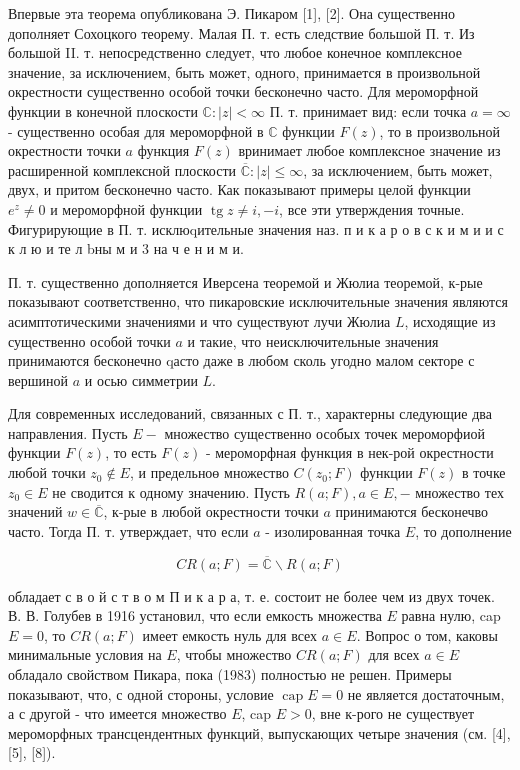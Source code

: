 \documentclass[10pt]{article}
\begin{document}
Впервые эта теорема опубликована Э. Пикаром [1], [2]. Она существенно дополняет Сохоцкого теорему. Малая П. т. есть следствие большой П. т. Из большой II. т. непосредственно следует, что любое конечное комплексное значение, за исключением, быть может, одного, принимается в произвольной окрестности существенно особой точки бесконечно часто. Для мероморфной функции в конечной плоскости $\mathbb{C}:|z|<\infty$ П. т. принимает вид: если точка $a=\infty$ - существенно особая для мероморфной в $\mathbb{C}$ функции $F(z)$, то в произвольной окрестности точки $a$ функция $F(z)$ вринимает любое комплексное значение из расширенной комплексной плоскости $\overline{\mathbb{C}}:|z| \leqslant \infty$, за исключением, быть может, двух, и притом бесконечно часто. Как показывают примеры целой функции $e^{z} \neq 0$ и мероморфной функции $\operatorname{tg} z \neq i,-i$, все эти утверждения точные. Фигурирующие в П. т. исклюqительные значения наз. п и к а р о в с к и м и и с к л ю и те л bны м и 3 на ч е н и м и.



П. т. существенно дополняется Иверсена теоремой и Жюлиа теоремой, к-рые показывают соответственно, что пикаровские исключительные значения являются асимптотическими значениями и что существуют лучи Жюлиа $L$, исходящие из существенно особой точки $a$ и такие, что неисключительные значения принимаются бесконечно qасто даже в любом сколь угодно малом секторе с вершиной $a$ и осью симметрии $L$.



Для современных исследований, связанных с П. т., характерны следующие два направления. Пусть $E-$ множество существенно особых точек мероморфиой функции $F(z)$, то есть $F(z)$ - мероморфная функция в нек-рой окрестности любой точки $z_{0} \notin E$, и предельноө множество $C\left(z_{0} ; F\right)$ функции $F(z)$ в точке $z_{0} \in E$ не сводится к одному значению. Пусть $R(a ; F), a \in E,-$ множество тех значений $w \in \overline{\mathbb{C}}$, к-рые в любой окрестности точки $a$ принимаются бесконечво часто. Тогда П. т. утверждает, что если $a$ - изолированная точка $E$, то дополнение



\[

C R(a ; F)=\overline{\mathbb{C}} \backslash R(a ; F)

\]



обладает с в о й с т в о м П и к а р а, т. е. состоит не более чем из двух точек. В. В. Голубев в 1916 установил, что если емкость множества $E$ равна нулю, cap $E=0$, то $C R(a ; F)$ имеет емкость нуль для всех $a \in E$. Вопрос о том, каковы минимальные условия на $E$, чтобы множество $C R(a ; F)$ для всех $a \in E$ обладало свойством Пикара, пока (1983) полностью не решен. Примеры показывают, что, с одной стороны, условие $\operatorname{cap} E=0$ не является достаточным, а с другой - что имеется множество $E$, cap $E>0$, вне к-рого не существует мероморфных трансцендентных функций, выпускающих четыре значения (см. [4], [5], [8]).
\end{document}
